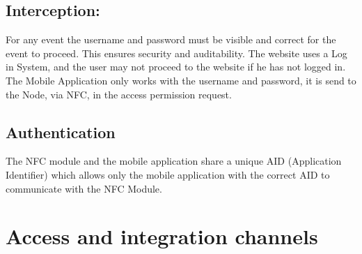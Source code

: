 \documentclass[a4paper,12pt,titlepage]{article}
\begin{document}
	\subsection{Interception: }For any event the username and password must be visible and correct for the event to proceed. This ensures security and auditability. The website uses a Log in System, and the user may not proceed to the website if he has not logged in. The Mobile Application only works with the username and password, it is send to the Node, via NFC, in the access permission request. 
	\subsection{Authentication}The NFC module and the mobile application share a unique AID (Application Identifier) which allows only the mobile application with the correct AID to communicate with the NFC Module.







\newpage	\section{Access and integration channels}
\end{document}
